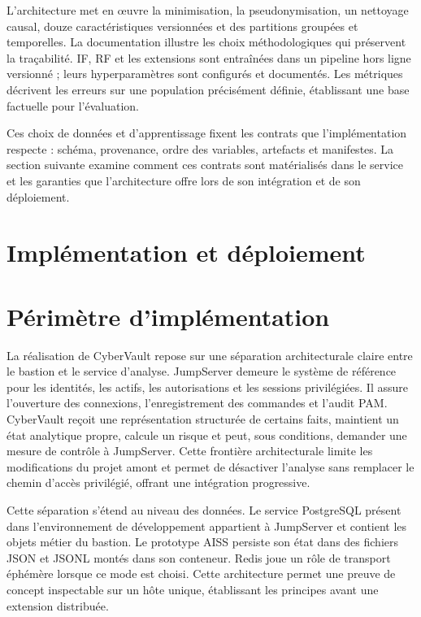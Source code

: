 \documentclass[11pt,a4paper,oneside]{report}
\theoremstyle{definition}
\theoremstyle{plain}
\begin{document}
L'architecture met en œuvre la minimisation, la pseudonymisation, un nettoyage
causal, douze caractéristiques versionnées et des partitions groupées et
temporelles. La documentation illustre les choix méthodologiques qui
préservent la traçabilité. IF, RF et les extensions sont entraînées dans un
pipeline hors ligne versionné ; leurs hyperparamètres sont configurés et
documentés. Les métriques décrivent les erreurs sur une population précisément
définie, établissant une base factuelle pour l'évaluation.

Ces choix de données et d'apprentissage fixent les contrats que
l'implémentation respecte : schéma, provenance, ordre des variables, artefacts
et manifestes. La section suivante examine comment ces contrats sont
matérialisés dans le service et les garanties que l'architecture offre lors de
son intégration et de son déploiement.

\section{Implémentation et déploiement}
\label{sec:impl-deploy}

\section{Périmètre d'implémentation}

La réalisation de CyberVault repose sur une séparation architecturale claire
entre le bastion et le service d'analyse. JumpServer demeure le système de
référence pour les identités, les actifs, les autorisations et les sessions
privilégiées. Il assure l'ouverture des connexions, l'enregistrement des
commandes et l'audit PAM. CyberVault reçoit une représentation structurée de
certains faits, maintient un état analytique propre, calcule un risque et
peut, sous conditions, demander une mesure de contrôle à JumpServer. Cette
frontière architecturale limite les modifications du projet amont et permet de
désactiver l'analyse sans remplacer le chemin d'accès privilégié, offrant
une intégration progressive.

Cette séparation s'étend au niveau des données. Le service PostgreSQL présent
dans l'environnement de développement appartient à JumpServer et contient les
objets métier du bastion. Le prototype AISS persiste son état dans des
fichiers JSON et JSONL montés dans son conteneur. Redis joue un rôle de
transport éphémère lorsque ce mode est choisi. Cette architecture permet une
preuve de concept inspectable sur un hôte unique, établissant les principes
avant une extension distribuée.
\end{document}
